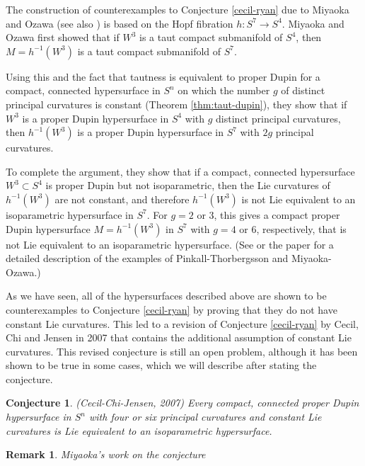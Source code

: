\documentclass[12pt]{article}
\newtheorem{remark}{Remark}[section]
\newtheorem{conjecture}{Conjecture}[section]
\begin{document}
{The construction of counterexamples to  Conjecture \ref{cecil-ryan} due to Miyaoka and Ozawa \cite{MO} (see also
\cite[pp. 117--123]{Cec9}) is based on the Hopf fibration
$h:S^7 \rightarrow S^4$.  
Miyaoka and Ozawa first showed that if $W^3$ is a taut
compact submanifold of $S^4$, then $M = h^{-1}(W^3)$ is a taut compact submanifold of
$S^7$.  

Using this and the fact that tautness is equivalent to proper Dupin
for a compact, connected hypersurface in $S^n$ on which the number $g$ of distinct principal 
curvatures is constant (Theorem \ref{thm:taut-dupin}),
they show that if $W^3$ is a proper Dupin hypersurface in
$S^4$ with $g$ distinct principal curvatures, then
$h^{-1}(W^3)$ is a proper Dupin hypersurface in $S^7$ with $2g$ principal
curvatures.  

To complete the argument, they show that if a compact, connected 
hypersurface $W^3 \subset S^4$ is proper Dupin
but not isoparametric, then the Lie curvatures of
$h^{-1}(W^3)$ are not constant, and therefore $h^{-1}(W^3)$ is not Lie
equivalent to an isoparametric hypersurface in $S^7$.  For $g=2$ or 3, this gives
a compact proper Dupin hypersurface $M = h^{-1}(W^3)$ in $S^7$ with $g=4$ or 6, respectively,
that is not Lie equivalent to an isoparametric hypersurface.  (See \cite[pp. 112--123]{Cec9}
or the paper \cite{Cec11} for a detailed description
of the examples of Pinkall-Thorbergsson and Miyaoka-Ozawa.)


As we have seen, all of the hypersurfaces described above are shown to be 
counterexamples to Conjecture \ref{cecil-ryan} by proving that they do not have
constant Lie curvatures.  This led to a revision of Conjecture \ref{cecil-ryan} by Cecil, Chi and Jensen
\cite[p. 52]{CCJ4} in 2007 that contains the additional assumption of constant Lie curvatures.
This revised conjecture
is still an open problem, although it  has been shown to be true in some cases,
which we will describe after stating the conjecture.


\begin{conjecture}
\label{revised-conjecture}
(Cecil-Chi-Jensen, 2007)
Every compact, connected proper Dupin hypersurface in $S^n$ with four or six principal curvatures
and constant Lie curvatures is Lie equivalent to an isoparametric hypersurface.
\end{conjecture}


\begin{remark}{Miyaoka's work on the conjecture} 
\label{rem:miyaoka-examples}


\end{remark}}
\end{document}
